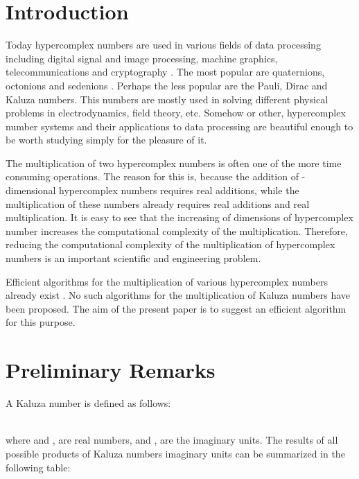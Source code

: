 \documentclass{jtacs}
\numberwithin{equation}{section}
\begin{document}
\section{Introduction}

Today hypercomplex numbers \cite{1} are used in various fields of data processing including digital signal and image processing, machine graphics, telecommunications and cryptography \cite{2,3,4,5,6,7,8,9,10}. The most popular are quaternions, octonions and sedenions \cite{1}. Perhaps the less popular are the Pauli, Dirac and Kaluza numbers. This numbers are mostly used in solving different physical problems in electrodynamics, field
theory, etc. Somehow or other, hypercomplex number systems and their applications to data processing are beautiful enough to be worth studying simply for the pleasure of it.

The multiplication of two hypercomplex numbers is often one of the more time consuming operations. The reason for this is, because the addition of -dimensional hypercomplex
numbers requires  real additions, while the multiplication of these numbers already
requires  real additions and  real multiplication. It is easy to see that the increasing
of dimensions of hypercomplex number increases the computational complexity of the
multiplication. Therefore, reducing the computational complexity of the multiplication of
hypercomplex numbers is an important scientific and engineering problem.

Efficient algorithms for the multiplication of various hypercomplex numbers already exist \cite{12,13,14,15,16,17,18,19,20,21,22,23,24}. No such algorithms for the multiplication of Kaluza numbers have been proposed. The aim of the present paper is to suggest an efficient algorithm for this purpose.

\section{Preliminary Remarks}

A Kaluza number is defined as follows:


\begin{adjustbox}{margin = 0 10 0 10}
\\
\end{adjustbox}
where   and  ,  are real numbers, and
,  are the imaginary units. The results of all possible products of Kaluza numbers imaginary units can be summarized in the following table:

\begin{adjustbox}{margin = 0 20 0 25}
\\
\end{adjustbox}
\end{document}
